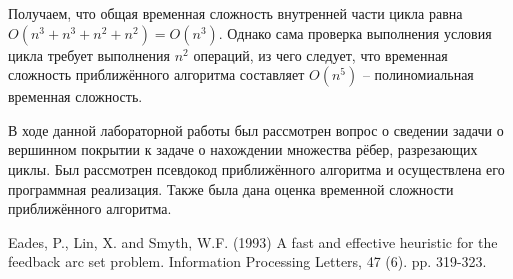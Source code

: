 \documentclass[spec, och, otchet, hidelinks]{SCWorks}
\begin{document}
Получаем, что общая временная сложность внутренней части цикла равна $O(n^3 + n^3 + n^2 + n^2) = O(n^3)$. Однако сама проверка выполнения условия цикла
требует выполнения $n^2$ операций, из чего следует, что временная сложность приближённого алгоритма составляет $O(n^5)$ -- полиномиальная временная 
сложность.

\conclusion

В ходе данной лабораторной работы был рассмотрен вопрос о сведении задачи о вершинном покрытии к задаче о нахождении множества рёбер, разрезающих циклы.
Был рассмотрен псевдокод приближённого алгоритма и осуществлена его программная реализация. Также была дана оценка временной сложности приближённого 
алгоритма.

\newpage

\begin{thebibliography}{1}
 Eades, P., Lin, X. and Smyth, W.F. (1993) A fast and effective heuristic for the feedback arc set problem. Information Processing Letters, 47 (6). pp. 319-323.
\end{thebibliography}
\end{document}
